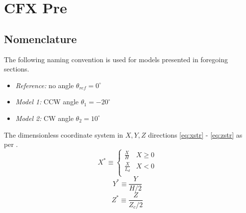 \chapter{CFX Pre}
\label{ch:pre}

\section{Nomenclature}
\label{sec:nomenclature}

The following naming convention is used for models presented in foregoing sections.
\begin{itemize}
	\item \textit{Reference:} no angle $\theta_{ref}=0^{\circ}$ 
	\item \textit{Model 1:} CCW angle $\theta_1=-20^{\circ}$ 
	\item \textit{Model 2:} CW angle $\theta_2=10^{\circ}$
\end{itemize}

The dimensionless coordinate system in $X,Y,Z$ directions \ref{eq:xstr} - \ref{eq:zstr} as per \cite{art}.
\begin{equation}
	X^* \equiv
	\begin{cases}
		\frac{X}{H}   & X\geq 0 \\
		\frac{X}{L_d} & X < 0   \\
	\end{cases}
	\label{eq:xstr}
\end{equation}
\begin{equation}
	\label{eq:ystr}
	Y^* \equiv \frac{Y}{H/2}
\end{equation}
\begin{equation}
	\label{eq:zstr}
	Z^* \equiv \frac{Z}{Z_c /2}
\end{equation}

